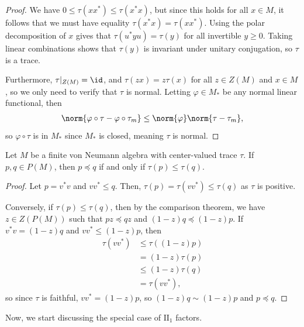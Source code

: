 \documentclass[10pt]{mypackage}
\begin{document}
\begin{proof}
  We have $0\leq \tau\left( xx^{\ast} \right)\leq \tau\left( x^{\ast}x \right)$, but since this holds for all $x\in M$, it follows that we must have equality $\tau\left( x^{\ast}x \right) = \tau\left( xx^{\ast} \right)$. Using the polar decomposition of $x$ gives that $\tau\left( u^{\ast}yu \right) = \tau\left( y \right)$ for all invertible $y\geq 0$. Taking linear combinations shows that $\tau\left( y \right)$ is invariant under unitary conjugation, so $\tau$ is a trace.

  Furthermore, $\tau|_{Z(M)} = \id$, and $\tau\left( zx \right) = z\tau(x)$ for all $z\in Z(M)$ and $x\in M$, so we only need to verify that $\tau$ is normal. Letting $\varphi\in M_{\ast}$ be any normal linear functional, then 
  \begin{align*}
    \norm{\varphi\circ\tau - \varphi\circ\tau_m}\leq \norm{\varphi}\norm{\tau-\tau_m},
  \end{align*}
  so $\varphi\circ \tau$ is in $M_{\ast}$ since $M_{\ast}$ is closed, meaning $\tau$ is normal.
\end{proof}
\begin{proposition}
  Let $M$ be a finite von Neumann algebra with center-valued trace $\tau$. If $p,q\in P(M)$, then $p\preceq q$ if and only if $\tau(p)\leq \tau(q)$.
\end{proposition}
\begin{proof}
  Let $p = v^{\ast}v$ and $vv^{\ast}\leq q$. Then, $\tau(p) = \tau\left( vv^{\ast} \right)\leq \tau(q)$ as $\tau$ is positive.

  Conversely, if $\tau(p)\leq \tau(q)$, then by the comparison theorem, we have $z\in Z(P(M))$ such that $pz\preceq qz$ and $\left( 1-z \right)q\preceq \left( 1-z \right)p$. If $v^{\ast}v = \left( 1-z \right)q$ and $vv^{\ast}\leq \left( 1-z \right)p$, then 
  \begin{align*}
    \tau\left( vv^{\ast} \right) &\leq \tau\left( \left( 1-z \right)p \right)\\
                                 &= \left( 1-z \right)\tau\left( p \right)\\
                                 &\leq \left( 1-z \right)\tau\left( q \right)\\
                                 &= \tau\left( vv^{\ast} \right),
  \end{align*}
  so since $\tau$ is faithful, $vv^{\ast} = \left( 1-z \right)p$, so $\left( 1-z \right)q\sim \left( 1-z \right)p$ and $p\preceq q$.
\end{proof}
Now, we start discussing the special case of $\text{II}_1$ factors.
\end{document}
